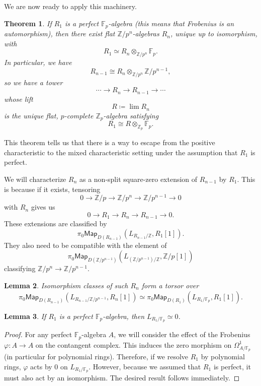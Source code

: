 \documentclass[10pt]{amsart}
\newtheorem{thm}{Theorem}[section]
\newtheorem{lem}[thm]{Lemma}
\theoremstyle{definition}
\theoremstyle{remark}
\theoremstyle{plain}
\theoremstyle{definition}
\theoremstyle{remark}
\newcommand{\Z}{\mathbb{Z}}
\newcommand{\F}{\mathbb{F}}
\newcommand{\ms}[1]{\mathsf{#1}}
\newcommand{\1}{\mathbf{1}}
\newcommand{\2}{\mathbf{2}}
\newcommand{\3}{\mathbf{3}}
\begin{document}
We are now ready to apply this machinery.
\begin{thm}\label{thm:wittvectors}
    If $R_1$ is a perfect $\F_p$-algebra (this means that Frobenius is an automorphism), then there exist flat $\Z/p^n$-algebras $R_n$, unique up to isomorphism, with 
    \[ R_1 \simeq R_n \otimes_{\Z/p^n} \F_p. \]
    In particular, we have
    \[ R_{n-1} \cong R_n \otimes_{\Z/p^n} \Z/p^{n-1}, \]
    so we have a tower
    \[ \cdots \to R_n \to R_{n-1} \to \cdots \]
    whose lift
    \[ R \coloneqq \lim R_n \]
    is the unique flat, $p$-complete $\Z_p$-algebra satisfying
    \[ R_1 \cong R \otimes_{\Z_p} \F_p. \]
\end{thm}

This theorem tells us that there is a way to escape from the positive characteristic to the mixed characteristic setting under the assumption that $R_1$ is perfect.

We will characterize $R_n$ as a non-split square-zero extension of $R_{n-1}$ by $R_1$. This is because if it exists, tensoring
\[ 0 \to \Z/p \to \Z/p^n \to \Z/p^{n-1} \to 0 \]
with $R_n$ gives us
\[ 0 \to R_1 \to R_n \to R_{n-1} \to 0. \]
These extensions are classified by
\[ \pi_0 \ms{Map}_{D(R_{n-1})} (L_{R_{n-1}/\Z}, R_1 [1]). \]
They also need to be compatible with the element of
\[ \pi_0 \ms{Map}_{D(\Z/p^{n-1})}(L_{(\Z/p^{n-1})/\Z}, \Z/p[1]) \]
classifying $\Z/p^n \to \Z/p^{n-1}$.

\begin{lem}
    Isomorphism classes of such $R_n$ form a torsor over
    \[ \pi_0 \ms{Map}_{D(R_{n-1})} (L_{R_{n-1}/\Z/p^{n-1}}, R_n[1]) \simeq \pi_0 \ms{Map}_{D(R_1)} (L_{R_1/\F_p}, R_1[1]). \]
\end{lem}

\begin{lem}
    If $R_1$ is a perfect $\F_p$-algebra, then $L_{R_1/\F_p} \simeq 0$.
\end{lem}

\begin{proof}
    For any perfect $\F_p$-algebra $A$, we will consider the effect of the Frobenius $\varphi \colon A \to A$ on the contangent complex. This induces the zero morphism on $\Omega^1_{A/\F_p}$ (in particular for polynomial rings). Therefore, if we resolve $R_1$ by polynomial rings, $\varphi$ acts by $0$ on $L_{R_1/\F_p}$. However, because we assumed that $R_1$ is perfect, it must also act by an isomorphism. The desired result follows immediately.
\end{proof}
\end{document}
